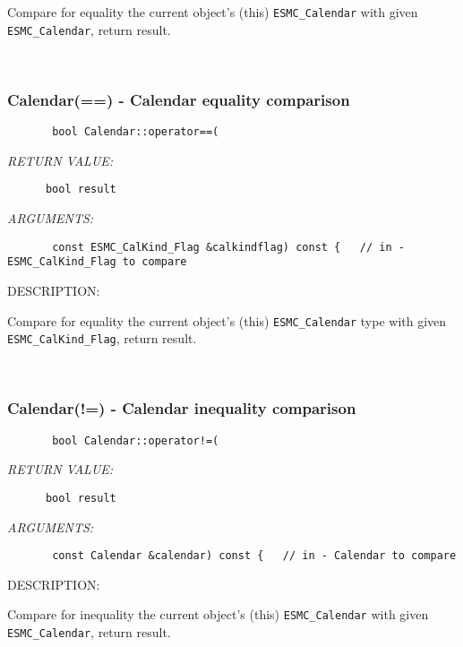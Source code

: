         Compare for equality the current object's (this) {\tt ESMC\_Calendar}
        with given {\tt ESMC\_Calendar}, return result.
   
 
\mbox{}\hrulefill\ 
 
\subsubsection [Calendar(==)] {Calendar(==) - Calendar equality comparison}


  
\begin{verbatim}       bool Calendar::operator==(\end{verbatim}{\em RETURN VALUE:}
\begin{verbatim}      bool result\end{verbatim}{\em ARGUMENTS:}
\begin{verbatim}       const ESMC_CalKind_Flag &calkindflag) const {   // in - ESMC_CalKind_Flag to compare\end{verbatim}
{\sf DESCRIPTION:\\ }


        Compare for equality the current object's (this) {\tt ESMC\_Calendar}
        type with given {\tt ESMC\_CalKind\_Flag}, return result.
   
 
\mbox{}\hrulefill\ 
 
\subsubsection [Calendar(!=)] {Calendar(!=) - Calendar inequality comparison}


  
\begin{verbatim}       bool Calendar::operator!=(\end{verbatim}{\em RETURN VALUE:}
\begin{verbatim}      bool result\end{verbatim}{\em ARGUMENTS:}
\begin{verbatim}       const Calendar &calendar) const {   // in - Calendar to compare\end{verbatim}
{\sf DESCRIPTION:\\ }


        Compare for inequality the current object's (this) {\tt ESMC\_Calendar}
        with given {\tt ESMC\_Calendar}, return result.
   
